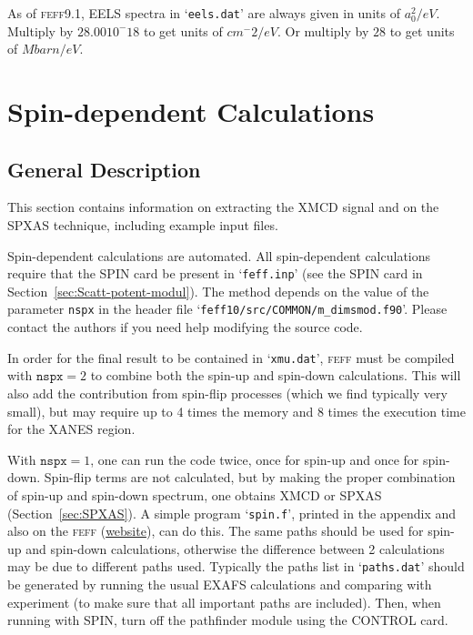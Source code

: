 \documentclass[11pt,oneside]{report} %
\renewcommand{\htmladdnormallink}[2]{\href{#2}{#1}}
\renewcommand{\htmlref}[2]{\hyperlink{#2}{#1}}
\newcommand{\program}[1]{\textsc{#1}}
\newcommand{\feff}{\program{feff}}
\newcommand{\file}[1]{`\texttt{#1}'}
\renewcommand{\htmlref}[2]{{#1}} %
\begin{document}
As of {\feff}9.1, EELS spectra in \file{eels.dat} are always given in units of $a_0^2 / eV$.  Multiply by $28.00 10^-18$  to get units of $cm^-2 / eV$.  Or multiply by $28$ to get units of  $Mbarn / eV$.



\section{Spin-dependent Calculations}
\label{sec:Spin-depend-calc}

\subsection{General Description}
\label{sec:General-description}
This section contains information on extracting the \htmlref{XMCD}{card:xnc} 
signal and on the SPXAS technique, including example input 
files.

Spin-dependent calculations are automated. All 
spin-dependent calculations require that the SPIN card be present in 
\file{feff.inp} (see the \htmlref{SPIN}{card:spi} card in 
Section~\ref{sec:Scatt-potent-modul}). 
The method depends on the value of the 
parameter \texttt{nspx} in the header file \file{feff10/src/COMMON/m\_dimsmod.f90}.
Please contact the authors if you need help modifying the source code.

In order for the final result to be contained in \file{xmu.dat}, 
{\feff} must be compiled with $\mathtt{nspx}=2$ to combine both the 
spin-up and spin-down calculations. This will also add the contribution from 
spin-flip processes (which we find typically very small), but may require up 
to 4 times the memory and 8 times the execution time for the XANES region. 

With $\mathtt{nspx}=1$, one can run the code twice, once for spin-up 
and once for spin-down.  Spin-flip terms are not calculated, but by making the proper combination of spin-up and spin-down spectrum, one obtains \htmlref{XMCD}{card:xnc} or SPXAS (Section~\ref{sec:SPXAS}).  A simple program \file{spin.f}, printed in the  \htmlref{appendix}{sec:Append-F-Spinf} and also on the {\feff} 
(\htmladdnormallink{website}{http://feff.phys.washington.edu/feff/}), can do this.  The same paths should be used for spin-up and spin-down calculations, 
otherwise the difference between 2 calculations may be due to 
different paths used. Typically the paths list in \file{paths.dat} 
should be generated by running the usual EXAFS calculations and 
comparing with experiment (to make sure that all important paths 
are included). Then, when running with SPIN, turn off the pathfinder 
module using the \htmlref{CONTROL}{card:con} card.
\end{document}
